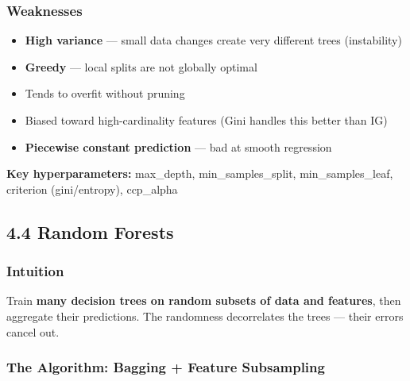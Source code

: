 \documentclass[11pt]{article}
\providecommand{\tightlist}{\setlength{\itemsep}{1pt}\setlength{\parskip}{0pt}}
\begin{document}
\subsubsection{Weaknesses}\label{weaknesses}

\begin{itemize}
\tightlist
\item
  \textbf{High variance} --- small data changes create very different trees (instability)
\item
  \textbf{Greedy} --- local splits are not globally optimal
\item
  Tends to overfit without pruning
\item
  Biased toward high-cardinality features (Gini handles this better than IG)
\item
  \textbf{Piecewise constant prediction} --- bad at smooth regression
\end{itemize}

\textbf{Key hyperparameters:} max\_depth, min\_samples\_split, min\_samples\_leaf, criterion (gini/entropy), ccp\_alpha

\subsection{4.4 Random Forests}\label{44-random-forests}

\subsubsection{Intuition}\label{intuition-3}

Train \textbf{many decision trees on random subsets of data and features}, then aggregate their predictions. The randomness decorrelates the trees --- their errors cancel out.

\subsubsection{The Algorithm: Bagging + Feature Subsampling}\label{the-algorithm-bagging--feature-subsampling}

\end{document}
